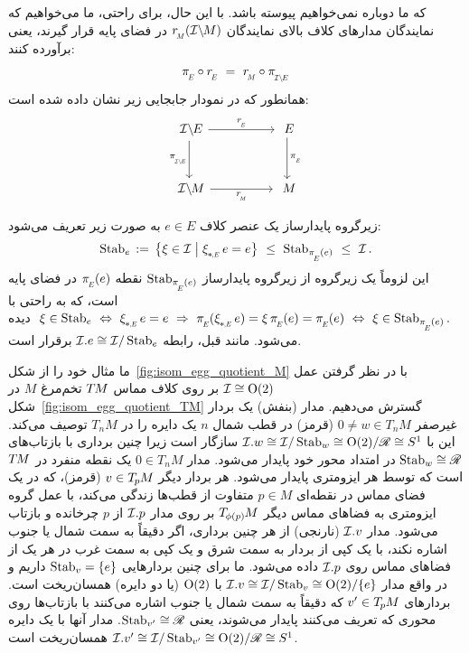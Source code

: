 که ما دوباره نمی‌خواهیم پیوسته باشد.
با این حال، برای راحتی، ما می‌خواهیم که نمایندگان مدارهای کلاف بالای نمایندگان $\rM(\IM)$ در فضای پایه قرار گیرند، یعنی برآورده کنند:
\begin{align}\label{eq:bundle_quotient_section_isom}
    \piE \circ \rE \ =\ \rM \circ \piIE
\end{align}
همانطور که در نمودار جابجایی زیر نشان داده شده است:
\begin{equation}
\begin{tikzcd}[column sep=50pt, row sep=30, font=\normalsize]
    \IE     \arrow[d, "\piIE"']
            \arrow[r, "\rE"]
    &
    E       \arrow[d, "\piE"]
    \\
    \IM     \arrow[r, "\rM"']
    &
    M
\end{tikzcd}
\end{equation}


زیرگروه پایدارساز یک عنصر کلاف $e\in E$ به صورت زیر تعریف می‌شود:
\begin{align}
    \Stab{e} \,:=\, \big\{ \xi \in \I \;\big|\; \dxiE e=e \big\} \ \leq\ \Stab{\piE(e)}\ \leq\ \I \,.
\end{align}
این لزوماً یک زیرگروه از زیرگروه پایدارساز $\Stab{\piE(e)}$ نقطه $\piE(e)$ در فضای پایه است، که به راحتی با
$ \ \xi \in \Stab{e}                 \ \Leftrightarrow\ 
    \dxiE e = e                      \ \Rightarrow\ 
    \piE(\dxiE e) = \xi\, \piE(e) = \piE(e) \ \Leftrightarrow\ 
    \xi \in \Stab{\piE(e)} .
$
دیده می‌شود. مانند قبل، رابطه $\mathcal{I}.e \cong \mathcal{I}/\operatorname{Stab}_{e}$ برقرار است.


ما مثال خود را از شکل~\ref{fig:isom_egg_quotient_M} با در نظر گرفتن عمل $\mathcal{I}\cong\operatorname{O}(2)$ بر روی کلاف مماس $T\mkern-1.5muM$ تخم‌مرغ $M$ در شکل~\ref{fig:isom_egg_quotient_TM} گسترش می‌دهیم.
مدار (بنفش) یک بردار غیرصفر $0\neq w\in T_nM$ (قرمز) در قطب شمال $n$ یک دایره را در $T_nM$ توصیف می‌کند.
این با $\mathcal{I}.w \cong \mathcal{I}/\operatorname{Stab}_{w} \cong \operatorname{O}(2)/\mathscr{R} \cong S^1$ سازگار است زیرا چنین برداری با بازتاب‌های $\operatorname{Stab}_{w} \cong \mathscr{R}$ در امتداد محور خود پایدار می‌شود.
مدار $0\in T_nM$ یک نقطه منفرد در $T\mkern-1.5muM$ است که توسط هر ایزومتری پایدار می‌شود.
هر بردار دیگر $v\in T_{\mkern-1.5mu p}\mkern-.5muM$ (قرمز)، که در یک فضای مماس در نقطه‌ای $p\in M$ متفاوت از قطب‌ها زندگی می‌کند، با عمل گروه ایزومتری به فضاهای مماس دیگر $T_{\mkern-1.5mu \phi(p)}\mkern-1muM$ بر روی مدار $\mathcal{I}.p$ از $p$ چرخانده و بازتاب می‌شود.
مدار $\mathcal{I}.v$ (نارنجی) از هر چنین برداری، اگر دقیقاً به سمت شمال یا جنوب اشاره نکند، با یک کپی از بردار به سمت شرق و یک کپی به سمت غرب در هر یک از فضاهای مماس روی $\mathcal{I}.p$ داده می‌شود.
ما برای چنین بردارهایی $\operatorname{Stab}_{v}=\{e\}$ داریم و در واقع مدار $\mathcal{I}.v \cong \mathcal{I}/\operatorname{Stab}_{v} \cong \operatorname{O}(2)/\{e\}$ با $\operatorname{O}(2)$ (یا دو دایره) همسان‌ریخت است.
بردارهای $v'\in T_{\mkern-1.5mu p}\mkern-.5muM$ که دقیقاً به سمت شمال یا جنوب اشاره می‌کنند با بازتاب‌ها روی محوری که تعریف می‌کنند پایدار می‌شوند، یعنی $\operatorname{Stab}_{v'} \cong \mathscr{R}$.
مدار آنها با یک دایره $\mathcal{I}.v' \cong \mathcal{I}/\operatorname{Stab}_{v'} \cong \operatorname{O}(2)/\mathscr{R} \cong S^1$ همسان‌ریخت است.

